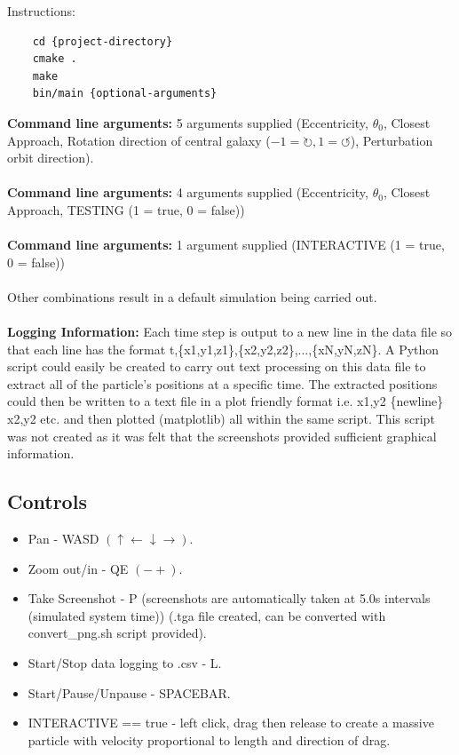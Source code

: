 \documentclass[10pt,a4paper]{article}
\begin{document}
Instructions:

\begin{lstlisting}
	cd {project-directory}
	cmake .
	make
	bin/main {optional-arguments}
\end{lstlisting}
\textbf{Command line arguments:} 5 arguments supplied (Eccentricity, $\theta_0$, Closest Approach, Rotation direction of central galaxy ($-1=\circlearrowright, 1=\circlearrowleft$), Perturbation orbit direction).
\\
\\
\textbf{Command line arguments:} 4 arguments supplied (Eccentricity, $\theta_0$, Closest Approach, TESTING (1 = true, 0 = false))
\\
\\
\textbf{Command line arguments:} 1 argument supplied (INTERACTIVE (1 = true, 0 = false))
\\
\\
Other combinations result in a default simulation being carried out.
\\
\\
\textbf{Logging Information:} Each time step is output to a new line in the data file so that each line has the format t,\{x1,y1,z1\},\{x2,y2,z2\},...,\{xN,yN,zN\}. A Python script could easily be created to carry out text processing on this data file to extract all of the particle's positions at a specific time. The extracted positions could then be written to a text file in a plot friendly format i.e. x1,y2 \{newline\} x2,y2 etc. and then plotted (matplotlib) all within the same script. This script was not created as it was felt that the screenshots provided sufficient graphical information.

\subsection{Controls}
\begin{itemize}
\item Pan - WASD $(\uparrow \leftarrow \downarrow \rightarrow)$.
\item Zoom out/in - QE $(-+)$.
\item Take Screenshot - P (screenshots are automatically taken at 5.0s intervals (simulated system time)) (.tga file created, can be converted with convert\_png.sh script provided).
\item Start/Stop data logging to .csv - L.
\item Start/Pause/Unpause - SPACEBAR.
\item INTERACTIVE == true - left click, drag then release to create a massive particle with velocity proportional to length and direction of drag.
\end{itemize}
\end{document}
